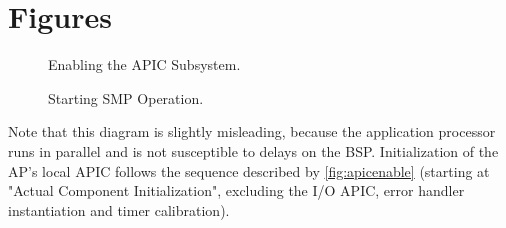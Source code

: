 \chapter{Figures}
\label{ch:figures}

\clearpage

\begin{figure}[H]
    \centering
    \begin{subfigure}[b]{0.85\textwidth}
        
    \end{subfigure}
    \caption{Enabling the APIC Subsystem.}
    \label{fig:apicenable}
\end{figure}

\begin{figure}[H]
    \centering
    \begin{subfigure}[b]{0.85\textwidth}
        
    \end{subfigure}
    \caption{Starting SMP Operation.}
    \label{fig:smpenable}
\end{figure}

Note that this diagram is slightly misleading, because the application processor runs in parallel and is not susceptible to delays on the BSP\@.
Initialization of the AP's local APIC follows the sequence described by \autoref{fig:apicenable} (starting at "Actual Component Initialization", excluding the I/O APIC, error handler instantiation and timer calibration).

\cleardoublepage